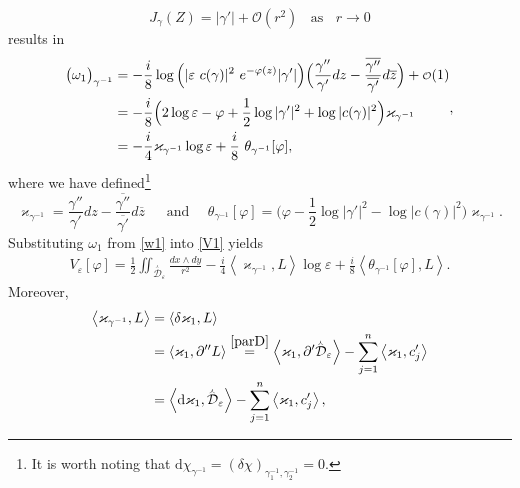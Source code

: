 \documentclass[a4paper,11pt]{article}
\newcommand{\dd}{\mathrm{d}}
\newcommand{\singfund}{\overset{{}_{\curlywedge}}{\mathcal{D}}}
\newcommand\smallO{
	\mathchoice
	{{\scriptstyle\mathcal{O}}}%
	{{\scriptstyle\mathcal{O}}}%
	{{\scriptscriptstyle\mathcal{O}}}%
	{\scalebox{.7}{$\scriptscriptstyle\mathcal{O}$}}%
}
\newcommand{\stks}[1]{
	 \left< #1 \right>
}
\begin{document}
\begin{equation}
J_{\gamma}(Z) = |\gamma'| +\mathcal{O}(r^2)~~~~\text{as}~~~~r\rightarrow 0
\end{equation}
results in
\begin{equation}
\begin{aligned}
\big(\omega_1\big)_{\gamma^{-1}} &=
-\frac{i}{8} \log \Big(
|\varepsilon~c(\gamma)|^2 ~e^{-\varphi(z)} |\gamma'| 
\Big) \Big(
\frac{\gamma''}{\gamma'}dz -  \frac{\overline{\gamma''}}{\overline{\gamma'}}d\overline{z}
\Big) +\smallO(1)\\ &= 
-\frac{i}{8} \Big(
2\log \varepsilon  -\varphi + \frac12 \log |\gamma'|^2 + \log |c(\gamma)|^2  
\Big)\varkappa_{\gamma^{-1}}\\ &=
-\frac{i}{4}  \varkappa_{ \gamma^{-1}}
\log \varepsilon 
 +\frac{i}{8} ~\theta_{\gamma^{-1}} [\varphi],
\end{aligned},\label{w1}
\end{equation}
where we have defined\footnote{It is worth noting that $\dd \chi_{\gamma^{-1}}=(\delta\chi)_{\gamma_1^{-1},\gamma_2^{-1}}=0.$}
\begin{equation}
\varkappa_{\gamma^{-1}} = \frac{\gamma''}{\gamma'}dz -  \frac{\overline{\gamma''}}{\overline{\gamma'}}d\overline{z} ~~~~~~~\text{and}~~~~~~\theta_{\gamma^{-1}}[\varphi] = \Big(\varphi - \frac12 \log |\gamma'|^2 - \log |c(\gamma)|^2  
\Big)\varkappa_{\gamma^{-1}}.\label{chigm1}
\end{equation}
Substituting $\omega_{1}$ from \eqref{w1} into \eqref{V1} yields
\begin{equation}
\begin{aligned}
V_\varepsilon[\varphi] =\frac12 \iint_{\singfund_{\varepsilon}} \frac{dx\wedge dy}{r^2} -\frac{i}{4}\stks{\varkappa_{\gamma^{-1}},L}\log \varepsilon + \frac{i}{8} \stks{\theta_{\gamma^{-1}}[\varphi],L}.
\end{aligned}\label{V2}
\end{equation}
Moreover,
\begin{equation}
\begin{aligned}
\stks{\varkappa_{\gamma^{-1}},L}&=\stks{\delta \varkappa_1,L} \\&  = \stks{\varkappa_1,\partial'' L} \overset{\eqref{parD}}{=} \stks{\varkappa_1,\partial' \singfund_{\varepsilon}} - \sum_{j=1}^{n}\stks{\varkappa_1, c'_j} \\ &=
\stks{\dd\varkappa_1,\singfund_{\varepsilon}} - \sum_{j=1}^{n}\stks{\varkappa_1 ,  c'_j},\label{qq1}
\end{aligned}
\end{equation}
\end{document}
